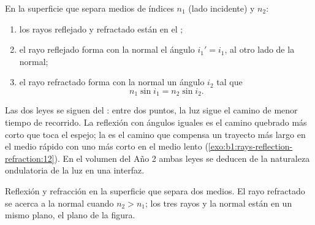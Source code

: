\begin{theorem}\label{thm:b1:rays-reflection-refraction:snell}
En la superficie que separa medios de índices $n_1$ (lado incidente) y
$n_2$:
\begin{enumerate}
  \item los rayos reflejado y refractado están en el ;
  \item el rayo reflejado forma con la normal el ángulo $i_1' = i_1$,
        al otro lado de la normal;
  \item el rayo refractado forma con la normal un ángulo $i_2$ tal que
        \[
        n_1 \sin i_1 = n_2 \sin i_2 .
        \]
\end{enumerate}
\end{theorem}
\admitted

\begin{remark}\label{rem:b1:rays-reflection-refraction:fermat}
Las dos leyes se siguen del \emph{}: entre dos puntos,
la luz sigue el camino de menor tiempo de recorrido. La reflexión con
ángulos iguales es el camino quebrado más corto que toca el espejo; la  es el camino que compensa un trayecto más largo en el medio
rápido con uno más corto en el medio lento
(\cref{exo:b1:rays-reflection-refraction:12}). En el volumen del Año 2
ambas leyes se deducen de la naturaleza ondulatoria de la luz en una
interfaz.
\end{remark}

\begin{omfigure}

{\small Reflexión y refracción en la superficie que separa dos medios.
El rayo refractado se acerca a la normal cuando $n_2 > n_1$; los tres
rayos y la normal están en un mismo plano, el plano de la figura.}
\end{omfigure}

